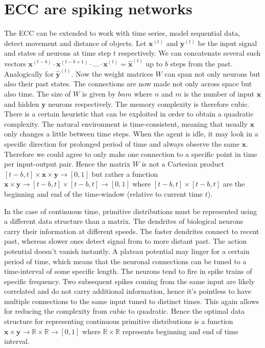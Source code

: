\documentclass[12pt]{article}
\begin{document}
\section{ECC are spiking networks}

The ECC can be extended to work with time series, model sequential data, detect movement and distance of objects. Let $\boldsymbol{x}^{(t)}$ and $\boldsymbol{y}^{(t)}$ be the input signal and states of neurons at time step $t$ respectively. We can concatenate several such vectors $\boldsymbol{x}^{(t-b)}\cdot \boldsymbol{x}^{(t-b+1) }\cdot ...\cdot\boldsymbol{x}^{(t)}=\boldsymbol{\hat{x}}^{(t)}$ up to $b$ steps from the past. Analogically for $\boldsymbol{\hat{y}}^{(t)}$. Now the weight matrices $W$ can span not only neurons but also their past states. The connections are now made not only across space but also time. The size of $W$ is given by $bnm$ where $n$ and $m$ is the number of input $\boldsymbol{x}$ and hidden $\boldsymbol{y}$ neurons respectively. The memory complexity is therefore cubic. There is a certain heuristic that can be exploited in order to obtain a quadratic complexity. The natural environment is time-consistent, meaning that usually $\boldsymbol{x}$ only changes a little between time steps. When the agent is idle, it may look in a specific direction for prolonged period of time and always observe the same $\boldsymbol{x}$. Therefore we could agree to only make one connection to a specific point in time per input-output pair. Hence the matrix $W$ is not a Cartesian product $[t-b,t] \times \boldsymbol{x} \times \boldsymbol{y} \rightarrow [0,1]$  but rather a function $\boldsymbol{x} \times \boldsymbol{y} \rightarrow [t-b,t] \times [t-b,t] \rightarrow [0,1]$ where $[t-b,t] \times [t-b,t]$ are the beginning and end of the time-window (relative to current time $t$).

In the case of continuous time, primitive distributions must be represented using a different data structure than a matrix. The dendrites of biological neurons carry their information at different speeds. The faster dendrites connect to recent past, whereas slower ones detect signal from to more distant past. The action potential doesn't vanish instantly. A plateau potential may linger for a certain period of time, which means that the neuronal connections can be tuned to a time-interval of some specific length. The neurons tend to fire in spike trains of specific frequency. Two subsequent spikes coming from the same input are likely correlated and do not carry additional information, hence it's pointless to have multiple connections to the same input tuned to distinct times. This again allows for reducing the complexity from cubic to quadratic. Hence the optimal data structure for representing continuous primitive distributions is a function $\boldsymbol{x} \times \boldsymbol{y} \rightarrow \mathbb{R} \times \mathbb{R} \rightarrow [0,1]$ where $\mathbb{R} \times \mathbb{R}$ represents beginning and end of time interval.
\end{document}
